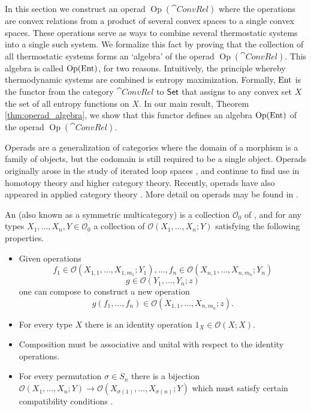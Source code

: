 \documentclass[12pt, reqno]{amsart}
\renewcommand{\O}{\mathcal{O}}
\DeclareMathOperator{\Op}{Op}
\newcommand{\convrelC}{\cat{ConvRel}}
\begin{document}
In this section we construct an operad $\Op(\convrelC)$ where the operations are convex relations from a product of several convex spaces to a single convex spaces. These operations serve as ways to combine several thermostatic systems into a single such system. We formalize this fact by proving that the collection of all thermostatic systems forms an `algebra' of the operad $\Op(\convrelC)$. This algebra is called $\Op(\Ent)$, for two reasons. Intuitively, the principle whereby thermodynamic systems are combined is entropy maximization. Formally, $\mathrm{Ent}$ is the functor from the category $\convrelC$ to $\mathsf{Set}$ that assigns to any convex set $X$ the set of all entropy functions on $X$. In our main result, Theorem \ref{thm:operad_algebra}, we show that this functor defines an algebra $\Op(\Ent)$ of the operad $\Op(\convrelC)$.

Operads are a generalization of categories where the domain of a morphism is a family of objects, but the codomain is still required to be a single object. Operads originally arose in the study of iterated loop spaces \cite{May}, and continue to find use in homotopy theory and higher category theory. Recently, operads have also appeared in applied category theory \cite{NetMod, FoleyBreinerSubDusel, Spivak}. More detail on operads may be found in \cite{MarklShniderStasheff, SetOperads, Yau}. 

\begin{definition}
    An  (also known as a symmetric multicategory) is a collection $\O_0$ of , and for any types $X_1, \ldots, X_n, Y \in \O_0$ a collection of  $\O(X_1, \ldots, X_n; Y)$ satisfying the following properties.
    \begin{itemize}
        \item Given operations
        \[f_1 \in \O(X_{1, 1}, \ldots, X_{1, m_1}; Y_1), \ldots, f_n \in \O(X_{n, 1}, \ldots, X_{n, m_n}; Y_n)\]
        \[g \in \O(Y_1, \ldots, Y_n; z)\]
        one can compose to construct a new operation
        \[g(f_1, \ldots, f_n) \in \O(X_{1, 1}, \ldots, X_{n, m_n}; z).\]
        \item For every type $X$ there is an identity operation $1_X \in \O(X; X)$.
        \item Composition must be associative and unital with respect to the identity operations.
        \item For every permutation $\sigma \in S_n$ there is a bijection $\O(X_1, \dots, X_n; Y) \to \O(X_{\sigma(1)}, \dots, X_{\sigma(n)}; Y)$ which must satisfy certain compatibility conditions \cite{Yau}.
    \end{itemize}
\end{definition}
\end{document}

